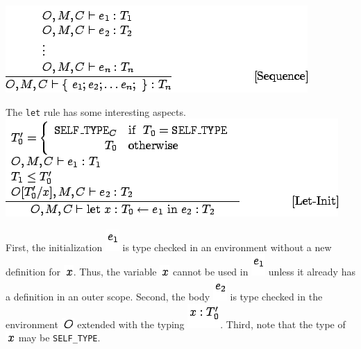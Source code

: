 \documentclass[]{article}
\begin{document}
\includegraphics{img89.png}

The \texttt{let} rule has some interesting aspects. \\

\includegraphics{img90.png}

First, the initialization \includegraphics{img76.png} is type checked in
an environment without a new definition for \includegraphics{img91.png}.
Thus, the variable \includegraphics{img91.png} cannot be used in
\includegraphics{img76.png} unless it already has a definition in an
outer scope. Second, the body \includegraphics{img92.png} is type
checked in the environment \includegraphics{img56.png} extended with the
typing \includegraphics{img93.png}. Third, note that the type of
\includegraphics{img91.png} may be \texttt{SELF\_TYPE}.
\end{document}
